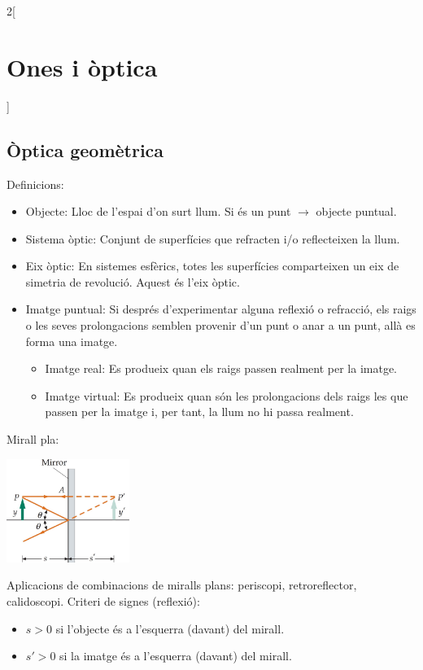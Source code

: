 \documentclass[../../../main.tex]{subfiles}
\begin{document}
\begin{multicols}{2}[\section{Ones i òptica}]
\subsection{Òptica geomètrica}
Definicions:
\begin{itemize}
    \item Objecte: Lloc de l'espai d'on surt llum. Si és un punt $\rightarrow$ objecte puntual.
    \item Sistema òptic: Conjunt de superfícies que refracten i/o reflecteixen la llum.
    \item Eix òptic: En sistemes esfèrics, totes les superfícies comparteixen un eix de simetria de revolució. Aquest és l'eix òptic.
    \item Imatge puntual: Si després d'ex\-pe\-ri\-men\-tar alguna reflexió o refracció, els raigs o les seves prolongacions semblen provenir d'un punt o anar a un punt, allà es forma una imatge.
    \begin{itemize}
        \item Imatge real: Es produeix quan els raigs passen realment per la imatge.
        \item Imatge virtual: Es produeix quan són les prolongacions dels raigs les que passen per la imatge i, per tant, la llum no hi passa realment.
    \end{itemize}
\end{itemize}
Mirall pla:\newline
\begin{minipage}{\linewidth}
    \centering
    \includegraphics[width=4cm]{Physics/1st/Waves_and_optics/Images/pla.jpg} 
\end{minipage}
Aplicacions de combinacions de miralls plans: periscopi, retroreflector, calidoscopi.\newline
Criteri de signes (reflexió): 
\begin{itemize}
    \item $s>0$ si l'objecte és a l'esquerra (davant) del mirall.
    \item $s'>0$ si la imatge és a l'esquerra (davant) del mirall.

\end{itemize}
\end{multicols}
\end{document}
